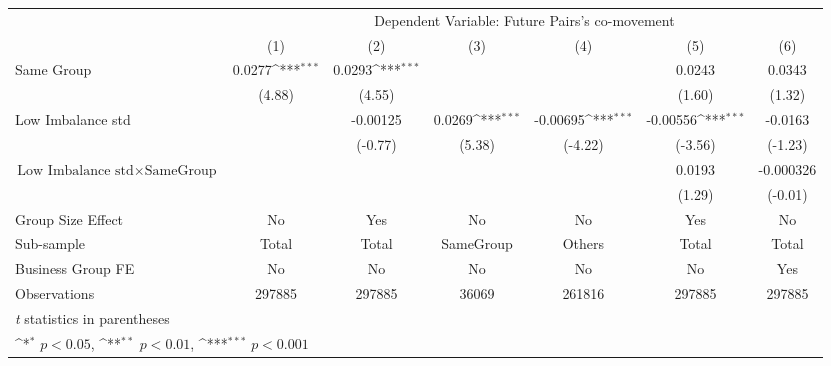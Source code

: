 {
\def\sym#1{\ifmmode^{#1}\else\(^{#1}\)\fi}
\begin{tabular}{l*{6}{c}}
\hline\hline
                &\multicolumn{6}{c}{Dependent Variable:  Future Pairs's co-movement}                                              \\\cmidrule(lr){2-7}
                &\multicolumn{1}{c}{(1)}         &\multicolumn{1}{c}{(2)}         &\multicolumn{1}{c}{(3)}         &\multicolumn{1}{c}{(4)}         &\multicolumn{1}{c}{(5)}         &\multicolumn{1}{c}{(6)}         \\
\hline
Same Group      &   0.0277\sym{***}&   0.0293\sym{***}&                  &                  &   0.0243         &   0.0343         \\
                &   (4.88)         &   (4.55)         &                  &                  &   (1.60)         &   (1.32)         \\
[1em]
Low Imbalance std&                  & -0.00125         &   0.0269\sym{***}& -0.00695\sym{***}& -0.00556\sym{***}&  -0.0163         \\
                &                  &  (-0.77)         &   (5.38)         &  (-4.22)         &  (-3.56)         &  (-1.23)         \\
[1em]
 $ \text{Low Imbalance std} \times {\text{SameGroup} } $ &                  &                  &                  &                  &   0.0193         &-0.000326         \\
                &                  &                  &                  &                  &   (1.29)         &  (-0.01)         \\
\hline
Group Size Effect&       No         &      Yes         &       No         &       No         &      Yes         &       No         \\
Sub-sample      &    Total         &    Total         &SameGroup         &   Others         &    Total         &    Total         \\
Business Group FE&       No         &       No         &       No         &       No         &       No         &      Yes         \\
Observations    &   297885         &   297885         &    36069         &   261816         &   297885         &   297885         \\
\hline\hline
\multicolumn{7}{l}{\footnotesize \textit{t} statistics in parentheses}\\
\multicolumn{7}{l}{\footnotesize \sym{*} \(p<0.05\), \sym{**} \(p<0.01\), \sym{***} \(p<0.001\)}\\
\end{tabular}
}
